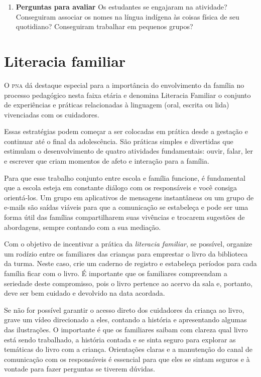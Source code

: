 \documentclass[11pt]{extarticle}
\begin{document}
\begin{enumerate}
\item \textbf{Perguntas para avaliar}\quad
Os estudantes se engajaram na atividade? Conseguiram associar os nomes na
língua indígena às coisas física de seu quotidiano?
Conseguiram trabalhar em pequenos grupos? 

\end{enumerate}

\section{Literacia familiar}
O \textsc{pna} dá destaque especial para a importância do envolvimento da família 
no processo pedagógico nesta faixa etária e denomina Literacia Familiar o conjunto 
de experiências e práticas relacionadas à linguagem (oral, escrita ou lida) vivenciadas 
com os cuidadores. 

Essas estratégias podem começar a ser colocadas em prática desde a 
gestação e continuar até o final da adolescência. São práticas simples e divertidas 
que estimulam o desenvolvimento de quatro atividades fundamentais: ouvir, falar, 
ler e escrever que criam momentos de afeto e interação para a família. 

Para que esse trabalho conjunto entre escola e família funcione, é 
fundamental que a escola esteja em constante diálogo com os responsáveis e 
você consiga orientá-los. Um grupo em aplicativos de mensagens instantâneas ou um 
grupo de e-mails são saídas viáveis para que a comunicação se estabeleça e pode ser 
uma forma útil das famílias compartilharem suas vivências e trocarem sugestões 
de abordagens, sempre contando com a sua mediação. 

Com o objetivo de incentivar 
a prática da \textit{literacia familiar}, se possível, organize um rodízio entre os familiares 
das crianças para emprestar o livro da biblioteca da turma. Neste caso, crie um caderno 
de registro e estabeleça períodos para cada família ficar com o livro. É importante 
que os familiares compreendam a seriedade deste compromisso, pois o livro pertence 
ao acervo da sala e, portanto, deve ser bem cuidado e devolvido na data acordada. 

Se não for possível garantir o acesso direto dos cuidadores da criança ao livro, 
grave um vídeo direcionado a eles, contando a história e apresentando algumas 
das ilustrações. O importante é que os familiares saibam com clareza qual livro 
está sendo trabalhado, a história contada e se sinta seguro para explorar as temáticas 
do livro com a criança. Orientações claras e a manutenção do canal de comunicação com 
os responsáveis é essencial para que eles se sintam seguros e à vontade para fazer perguntas 
se tiverem dúvidas. 
\end{document}
